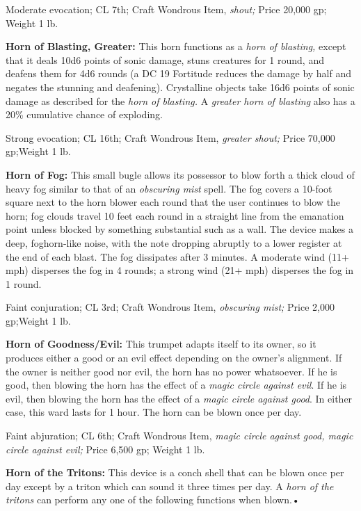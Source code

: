Moderate evocation; CL 7th; Craft Wondrous Item, \textit{shout; }Price 20,000 gp; 
Weight 1 lb.

\textbf{Horn of Blasting, Greater:} This horn functions as a \textit{horn of blasting, 
}except that it deals 10d6 points of sonic damage, stuns creatures for 1 round, 
and deafens them for 4d6 rounds (a DC 19 Fortitude reduces the damage by half and 
negates the stunning and deafening). Crystalline objects take 16d6 points of sonic 
damage as described for the \textit{horn of blasting. }A \textit{greater horn of 
blasting }also has a 20\% cumulative chance of exploding.

Strong evocation; CL 16th; Craft Wondrous Item, \textit{greater shout; }Price 70,000 
gp;Weight 1 lb.

\textbf{Horn of Fog: }This small bugle allows its possessor to blow forth a thick 
cloud of heavy fog similar to that of an \textit{obscuring mist }spell. The fog 
covers a 10-foot square next to the horn blower each round that the user continues 
to blow the horn; fog clouds travel 10 feet each round in a straight line from 
the emanation point unless blocked by something substantial such as a wall. The 
device makes a deep, foghorn-like noise, with the note dropping abruptly to a lower 
register at the end of each blast. The fog dissipates after 3 minutes. A moderate 
wind (11+ mph) disperses the fog in 4 rounds; a strong wind (21+ mph) disperses 
the fog in 1 round.

Faint conjuration; CL 3rd; Craft Wondrous Item, \textit{obscuring mist; }Price 
2,000 gp;Weight 1 lb.

\textbf{Horn of Goodness/Evil:} This trumpet adapts itself to its owner, so it 
produces either a good or an evil effect depending on the owner's alignment. If 
the owner is neither good nor evil, the horn has no power whatsoever. If he is 
good, then blowing the horn has the effect of a \textit{magic circle against evil}. 
If he is evil, then blowing the horn has the effect of a \textit{magic circle against 
good}. In either case, this ward lasts for 1 hour. The horn can be blown once per 
day.

Faint abjuration; CL 6th; Craft Wondrous Item, \textit{magic circle against good, 
magic circle against evil; }Price 6,500 gp; Weight 1 lb.

\textbf{Horn of the Tritons:} This device is a conch shell that can be blown once 
per day except by a triton which can sound it three times per day. A \textit{horn 
of the tritons }can perform any one of the following functions when blown.•

